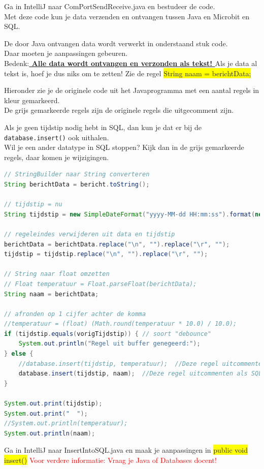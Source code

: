 Ga in IntelliJ naar ComPortSendReceive.java en bestudeer de code.\\
Met deze code kun je data verzenden en ontvangen tussen Java en Microbit en SQL.

De door Java ontvangen data wordt verwerkt in onderstaand stuk code. \\
Daar moeten je aanpassingen gebeuren. \\
Bedenk:\textbf{\underline{ Alle data wordt ontvangen en verzonden als tekst! }}
Als je data al tekst is, hoef je dus niks om te zetten! Zie de regel \colorbox{yellow}{String naam = berichtData;}


Hieronder zie je de originele code uit het Javaprogramma met een aantal regels in kleur gemarkeerd.\\
\colorbox{mygray}{De grijs gemarkeerde regels zijn de originele regels die uitgecomment zijn.}\\


Als je geen tijdstip nodig hebt in SQL, dan kun je dat er bij de \texttt{database.insert()} ook uithalen.\\
Wil je een ander datatype in SQL stoppen? Kijk dan in de grijs gemarkeerde regels, daar komen je wijzigingen.


\begin{lstlisting}[language=JAVA,basicstyle=\tiny]
// StringBuilder naar String converteren
String berichtData = bericht.toString();

// tijdstip = nu
String tijdstip = new SimpleDateFormat("yyyy-MM-dd HH:mm:ss").format(new Date());

// regeleindes verwijderen uit data en tijdstip
berichtData = berichtData.replace("\n", "").replace("\r", "");
tijdstip = tijdstip.replace("\n", "").replace("\r", "");

// String naar float omzetten
// Float temperatuur = Float.parseFloat(berichtData);
String naam = berichtData;

// afronden op 1 cijfer achter de komma
//temperatuur = (float) (Math.round(temperatuur * 10.0) / 10.0);
if (tijdstip.equals(vorigTijdstip)) { // soort "debounce"
	System.out.println("Regel uit buffer genegeerd:");
} else {
	//database.insert(tijdstip, temperatuur);  //Deze regel uitcommenten als SQL nog niet werkt.
	database.insert(tijdstip, naam);  //Deze regel uitcommenten als SQL nog niet werkt.
}

System.out.print(tijdstip);
System.out.print("  ");
//System.out.println(temperatuur);
System.out.println(naam);

\end{lstlisting}


Ga in IntelliJ naar InsertIntoSQL.java en maak je aanpassingen in \colorbox{yellow}{public void insert()}
\textcolor{red}{Voor verdere informatie: Vraag je Java of Databases docent!}


